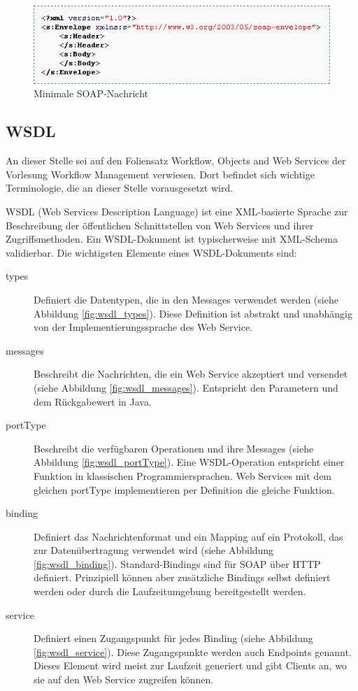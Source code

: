 \documentclass[runningheads]{llncs}
\newcommand{\germanquote}[1]{\glqq{}#1\grqq{}}
\begin{document}
    \begin{figure}[tbh]
      \centering
      \includegraphics[width=\textwidth]{../images/min_soap.png}
      \caption{Minimale SOAP-Nachricht}
      \label{fig:min_soap}
    \end{figure}


  \subsection{WSDL}
  \label{wsdl}
  \nocite{wk_wsdl}
  \nocite{tut_wsdl}
    An dieser Stelle sei auf den Foliensatz \germanquote{Workflow, Objects and Web
    Ser\-vi\-ces}\cite{wfm_ch7} der Vorlesung \germanquote{Workflow Management}\cite{wfm_site}
    verwiesen. Dort befindet sich wichtige Terminologie, die an dieser Stelle vorausgesetzt wird.

    WSDL (Web Services Description Language) ist eine XML-basierte Sprache zur Beschreibung der
    öffentlichen Schnittstellen von Web Services und ihrer Zugriffsmethoden. Ein WSDL-Dokument ist
    typischerweise mit XML-Schema validierbar. Die wichtigsten Elemente eines WSDL-Dokuments sind:
    \begin{description}
      \item[types]
        Definiert die Datentypen, die in den Messages verwendet werden (siehe Abbildung
        \ref{fig:wsdl_types}). Diese Definition ist abstrakt und unabhängig von der
        Implementierungssprache des Web Service.
      \item[messages]
        Beschreibt die Nachrichten, die ein Web Service akzeptiert und versendet (siehe Abbildung
        \ref{fig:wsdl_messages}). Entspricht den Parametern und dem Rückgabewert in Java.
      \item[portType]
        Beschreibt die verfügbaren Operationen und ihre Messages (siehe Abbildung
        \ref{fig:wsdl_portType}). Eine WSDL-Operation entspricht einer Funktion in klassischen
        Programmiersprachen. Web Services mit dem gleichen portType implementieren per Definition
        die gleiche Funktion.
      \item[binding]
        Definiert das Nachrichtenformat und ein Mapping auf ein Protokoll, das zur Datenübertragung
        verwendet wird (siehe Abbildung \ref{fig:wsdl_binding}). Standard-Bindings sind für SOAP
        über HTTP definiert. Prinzipiell können aber zusätzliche Bindings selbst definiert werden
        oder durch die Laufzeitumgebung bereitgestellt werden.
      \item[service]
        Definiert einen Zugangspunkt für jedes Binding (siehe Abbildung \ref{fig:wsdl_service}).
        Diese Zugangspunkte werden auch \germanquote{Endpoints} genannt. Dieses Element wird meist
        zur Laufzeit generiert und gibt Clients an, wo sie auf den Web Service zugreifen können.
     \end{description}
\end{document}
